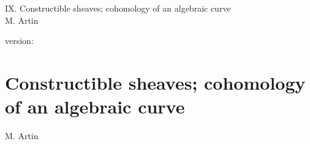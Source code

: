 \documentclass[10pt]{../fichiers-configuration-latex/smfart}
\begin{document}
\begin{center}
IX. Constructible sheaves; cohomology of an algebraic curve\\
M. Artin
\end{center}

version: \showgitstatus
\tableofcontents

\else
\chapter{Constructible sheaves; cohomology of an algebraic curve}
\begin{center}
M. Artin
\end{center}
\fi
{}\label{sga4.exp.IX}














\end{document}
